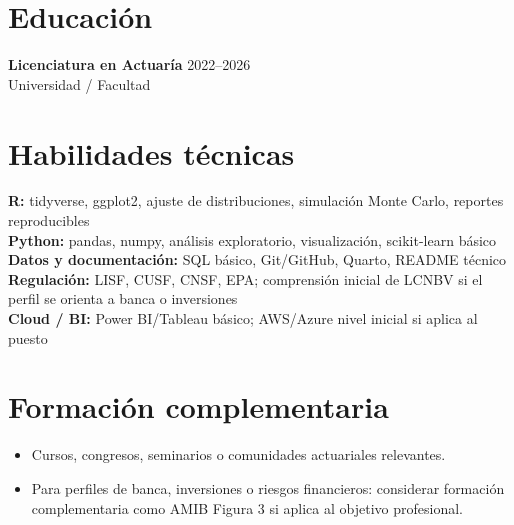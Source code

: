 \documentclass[10pt,letterpaper]{article}
\newcommand{\cvitem}[2]{\textbf{#1:} #2\\}
\begin{document}
\section*{Educación}
\textbf{Licenciatura en Actuaría} \hfill 2022--2026\\
Universidad / Facultad

\section*{Habilidades técnicas}
\cvitem{R}{tidyverse, ggplot2, ajuste de distribuciones, simulación Monte Carlo, reportes reproducibles}
\cvitem{Python}{pandas, numpy, análisis exploratorio, visualización, scikit-learn básico}
\cvitem{Datos y documentación}{SQL básico, Git/GitHub, Quarto, README técnico}
\cvitem{Regulación}{LISF, CUSF, CNSF, EPA; comprensión inicial de LCNBV si el perfil se orienta a banca o inversiones}
\cvitem{Cloud / BI}{Power BI/Tableau básico; AWS/Azure nivel inicial si aplica al puesto}

\section*{Formación complementaria}
\begin{itemize}
  \item Cursos, congresos, seminarios o comunidades actuariales relevantes.
  \item Para perfiles de banca, inversiones o riesgos financieros: considerar formación complementaria como AMIB Figura 3 si aplica al objetivo profesional.
\end{itemize}
\end{document}
